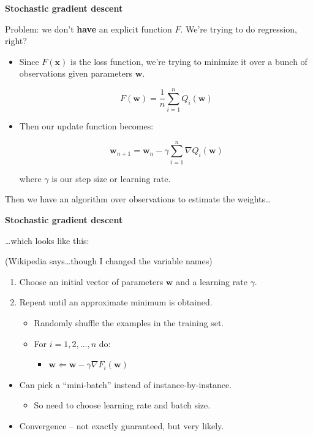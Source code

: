 \documentclass{beamer}
\newcommand{\pagestepalt}[2]{
  \begin{frame}[t]
    \begin{minipage}[t][0.26\textheight][t]{\textwidth}
      \begin{center}
        \huge
        \textbf{#1}
      \end{center}
    \end{minipage}
    
    \begin{minipage}[t][0.7\textheight][c]{\textwidth}
      #2
    \end{minipage}
  \end{frame}
}
\begin{document}
\pagestepalt{Stochastic gradient descent}{
  \vspace{-1.1cm}
  Problem: we don't \textbf{have} an explicit function $F$. We're trying to
  do \alert{regression}, right?\pause
  \begin{itemize}
  \item Since $F(\mathbf{x})$ is the loss function, we're trying to
    minimize it over a bunch of observations given parameters
    $\mathbf{w}$.\pause
    \begin{block}{}
      \[F(\mathbf{w}) = \frac{1}{n} \sum^n_{i=1} Q_i(\mathbf{w})\]
    \end{block}\pause
  \item Then our update function becomes:
    \begin{block}{}
      \[\mathbf{w}_{n+1} = \mathbf{w}_n - \gamma \sum^n_{i=1} \nabla Q_i(\mathbf{w}) \]
    \end{block}
    where $\gamma$ is our step size or \alert{learning rate}. \pause
  \end{itemize}
  Then we have an algorithm over observations to estimate the weights\ldots
}

\pagestepalt{Stochastic gradient descent}{
  \ldots which looks like this:\pause
  \begin{block}{(Wikipedia says\ldots though I changed the variable names)\pause}
    \begin{enumerate}
    \item Choose an initial vector of parameters $\mathbf{w}$ and a learning rate $\gamma$.\pause
    \item Repeat until an approximate minimum is obtained.\pause
      \begin{itemize}
      \item Randomly shuffle the examples in the training set.\pause
      \item For $i = 1,2,\ldots,n$ do:
        \begin{itemize}
          \item $\mathbf{w} \Leftarrow \mathbf{w} - \gamma\nabla F_i(\mathbf{w})$
        \end{itemize}
      \end{itemize}
    \end{enumerate}
  \end{block}\pause
  \begin{itemize}
  \item Can pick a ``mini-batch'' instead of instance-by-instance.\pause
    \begin{itemize}
    \item So need to choose learning rate and batch size.\pause
    \end{itemize}
  \item Convergence -- not exactly guaranteed, but very likely.
  \end{itemize}
}
\end{document}
